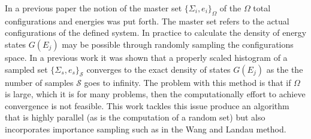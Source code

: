 \documentclass[twocolumn]{article}
\begin{document}
In a previous paper the notion of the master set $\{ \Sigma_i, e_i \}_\Omega $ of the $\Omega$ total configurations and energies was put forth. The master set refers to the actual configurations of the defined system. In practice to calculate the density of energy states $G(E_j)$  may be possible through randomly sampling the configurations space.  In a previous work it was shown that a properly scaled histogram of a sampled set $\{ \Sigma_s, e_s \}_\mathcal{S}$ converges to the exact density of states $G(E_j)$ as the the number of samples $\mathcal{S}$ goes to infinity. The problem with this method is that if $\Omega$ is large, which it is for many problems,  then the computationally effort to achieve convergence is not feasible.  This work tackles this issue produce an algorithm that is highly parallel (as is the computation of a random set) but also incorporates importance sampling such as in the Wang and Landau method.
\end{document}
